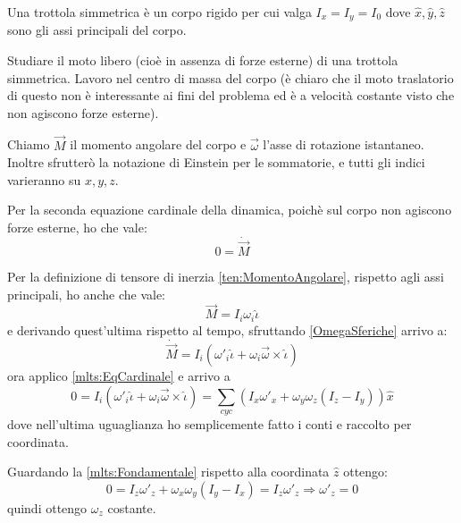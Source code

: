 \documentclass[../main.tex]{subfiles}
\begin{document}

\textex
Una trottola simmetrica è un corpo rigido per cui valga $I_x=I_y=I_0$ dove $\hat x, \hat y, \hat z$ sono gli assi principali del corpo.

Studiare il moto libero (cioè in assenza di forze esterne) di una trottola simmetrica.
\solution
Lavoro nel centro di massa del corpo (è chiaro che il moto traslatorio di questo non è interessante ai fini del problema ed è a velocità costante visto che non agiscono forze esterne).

Chiamo $\overrightarrow M$ il momento angolare del corpo e $\vec{\omega}$ l'asse di rotazione istantaneo. Inoltre sfrutterò la notazione di Einstein per le sommatorie, e tutti gli indici varieranno su $x,y,z$.

Per la seconda equazione cardinale della dinamica, poichè sul corpo non agiscono forze esterne, ho che vale:
\begin{equation}\label{mlts:EqCardinale}
	0=\dot{\overrightarrow M}
\end{equation}

Per la definizione di tensore di inerzia \cref{ten:MomentoAngolare}, rispetto agli assi principali, ho anche che vale:
\begin{equation}\label{mlts:MomentoComponenti}
	\overrightarrow M = I_i\omega_i \hat\iota
\end{equation}
e derivando quest'ultima rispetto al tempo, sfruttando \cref{OmegaSferiche} arrivo a:
\begin{equation*}
	\dot{\overrightarrow M}= I_i\left(\omega'_i\hat\iota + \omega_i\vec\omega\times \hat\iota\right)
\end{equation*}
ora applico \cref{mlts:EqCardinale} e arrivo a
\begin{equation}\label{mlts:Fondamentale}
	0=I_i\left(\omega'_i\hat\iota + \omega_i\vec\omega\times \hat\iota\right) =
	\sum_{cyc} \left( I_x\omega'_x+\omega_y\omega_z(I_z-I_y) \right)\hat x
\end{equation}
dove nell'ultima uguaglianza ho semplicemente fatto i conti e raccolto per coordinata.

Guardando la \cref{mlts:Fondamentale} rispetto alla coordinata $\hat z$ ottengo:
\begin{equation*} 
	0=I_z\omega'_z+\omega_x\omega_y(I_y-I_x)=I_z\omega'_z\Rightarrow \omega'_z=0
\end{equation*}
quindi ottengo $\omega_z$ costante.
\end{document}
